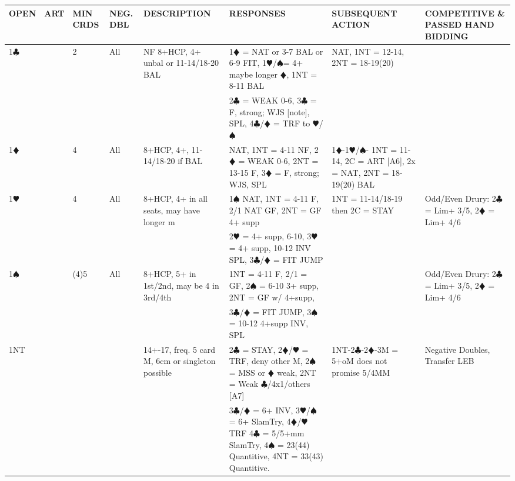 \documentclass{article}
\newcommand\C{\ensuremath{\clubsuit}}
\newcommand\D{\color{red}\ensuremath{\vardiamondsuit}}
\renewcommand\H{\color{red}\ensuremath{\varheartsuit}}
\renewcommand\S{\ensuremath{\spadesuit}}
\newcommand\N{{\footnotesize NT}}
\begin{document}
\noindent
\begin{tabular}{| p{9mm} | p{6mm} | p{6mm} | p{6mm} | p{58mm} | p{62mm} | p{58mm} | p{48mm} |}
	\hline
	\cellcolor{green!25} \textbf{OPEN} & \cellcolor{green!25} \textbf{ART} & \cellcolor{green!25} \textbf{MIN CRDS} & \cellcolor{green!25} \textbf{NEG. DBL} & \cellcolor{green!25} \textbf{DESCRIPTION} & \cellcolor{green!25} \textbf{RESPONSES} & \cellcolor{green!25} \textbf{SUBSEQUENT ACTION} & \cellcolor{green!25} \textbf{COMPETITIVE \& PASSED HAND BIDDING} \\ \hline
	1\C & & 2 & All
			& NF 8+HCP, 4+ unbal or 11-14/18-20 BAL
			& 1{\D} = NAT or 3-7 BAL or 6-9 FIT, 1{\H}/{\S}= 4+ maybe longer {\D}, 1NT = 8-11 BAL 
			& NAT, 1NT = 12-14, 2NT = 18-19(20)
			& \\ \hline
	& & & & & 2{\C} = WEAK 0-6, 3{\C} = F, strong; WJS [note], SPL, 4{\C}/{\D} = TRF to {\H}/{\S}& & \\ \hline
	1\D & & 4 & All 
			& 8+HCP, 4+, 11-14/18-20 if BAL 
			& NAT, 1NT = 4-11 NF, 2{\D} = WEAK 0-6, 2{\N} = 13-15 F, 3{\D} = F, strong; WJS, SPL
			& 1{\D}-1{\H}/{\S}- 1NT = 11-14, 2C = ART [A6], 2x = NAT, 2NT = 18-19(20) BAL & \\ \hline
	1\H & & 4 & All 
			& 8+HCP, 4+ in all seats, may have longer m
			& 1{\S} NAT, 1NT = 4-11 F, 2/1 NAT GF, 2NT = GF 4+ supp 
			& 1NT = 11-14/18-19 then 2C = STAY
			& Odd/Even Drury: 2{\C} = Lim+ 3/5, 2{\D} = Lim+ 4/6\\ \hline
	& & & & & 2{\H} = 4+ supp, 6-10, 3{\H} = 4+ supp, 10-12 INV 
			SPL, 3{\C}/{\D} = FIT JUMP& & \\ \hline
	1\S & & (4)5 & All 
			& 8+HCP, 5+ in 1st/2nd, may be 4 in 3rd/4th 
			& 1NT = 4-11 F, 2/1 = GF, 2{\S} = 6-10 3+ supp,
			2NT = GF w/ 4+supp,
			& 
			& Odd/Even Drury: 2{\C} = Lim+ 3/5, 2{\D} = Lim+ 4/6\\ \hline
	& & & & &  3{\C}/{\D} = FIT JUMP, 3{\S} = 10-12 4+supp INV, SPL& & \\ \hline
	1\N & & & & 14+-17, freq. 5 card M, 6cm or singleton possible 
			& 2{\C} = STAY, 2{\D}/{\H} = TRF, deny other M, 2{\S} = MSS or {\D} weak, 2{\N} = Weak {\C}/4x1/others [A7]
			& 1{\N}-2{\C}-2{\D}-3M = 5+oM does not promise 5/4MM
			& Negative Doubles, Transfer LEB\\ \hline
	& & & & & 3{\C}/{\D} = 6+ INV, 3{\H}/{\S} = 6+ SlamTry, 4{\D}/{\H} TRF
			4{\C} = 5/5+mm SlamTry, 4{\S} = 23(44) Quantitive, 4{\N} = 33(43) Quantitive.
			& & \\ \hline

\end{tabular}
\end{document}
